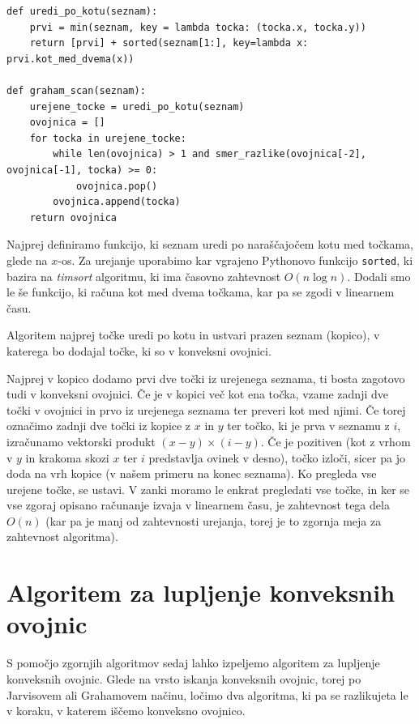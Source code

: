 \documentclass[a4paper]{article}
\begin{document}
\begin{lstlisting}
def uredi_po_kotu(seznam):
    prvi = min(seznam, key = lambda tocka: (tocka.x, tocka.y))
    return [prvi] + sorted(seznam[1:], key=lambda x: prvi.kot_med_dvema(x))

def graham_scan(seznam):
    urejene_tocke = uredi_po_kotu(seznam)
    ovojnica = []
    for tocka in urejene_tocke:
        while len(ovojnica) > 1 and smer_razlike(ovojnica[-2], ovojnica[-1], tocka) >= 0:           
            ovojnica.pop()
        ovojnica.append(tocka)
    return ovojnica
\end{lstlisting}

Najprej definiramo funkcijo, ki seznam uredi po naraščajočem kotu med točkama, glede na $x$-os. Za urejanje uporabimo kar vgrajeno Pythonovo funkcijo \texttt{sorted},
ki bazira na \textit{timsort} algoritmu, ki ima časovno zahtevnost $O(n \log n).$ Dodali smo le še funkcijo, ki računa kot med dvema točkama, kar pa se zgodi v linearnem času.

Algoritem najprej točke uredi po kotu in ustvari prazen seznam (kopico), 
v katerega bo dodajal točke, ki so v konveksni ovojnici.

Najprej v kopico dodamo prvi dve točki iz urejenega seznama, ti bosta zagotovo tudi v konveksni ovojnici.
Če je v kopici več kot ena točka, vzame zadnji dve točki v ovojnici in prvo iz urejenega seznama ter preveri kot med njimi. Če torej označimo zadnji dve točki iz kopice z $x$ in $y$ ter točko,
ki je prva v seznamu z $i$, izračunamo vektorski produkt $(x-y)\times(i-y)$. 
Če je pozitiven (kot z vrhom v $y$ in krakoma skozi $x$ ter $i$ predstavlja ovinek v desno), točko izloči, 
sicer pa jo doda na vrh kopice (v našem primeru na konec seznama). Ko pregleda vse urejene točke, se ustavi. 
V zanki moramo le enkrat pregledati vse točke, in ker se vse zgoraj opisano računanje izvaja v linearnem času, je zahtevnost tega dela $O(n)$ (kar pa je manj od zahtevnosti urejanja,
torej je to zgornja meja za zahtevnost algoritma).

\section{Algoritem za lupljenje konveksnih ovojnic}
S pomočjo zgornjih algoritmov sedaj lahko izpeljemo algoritem za lupljenje konveksnih ovojnic. Glede na vrsto iskanja konveksnih ovojnic, torej po Jarvisovem ali 
Grahamovem načinu, ločimo dva algoritma, ki pa se razlikujeta le v koraku, v katerem iščemo konveksno ovojnico.
\end{document}
